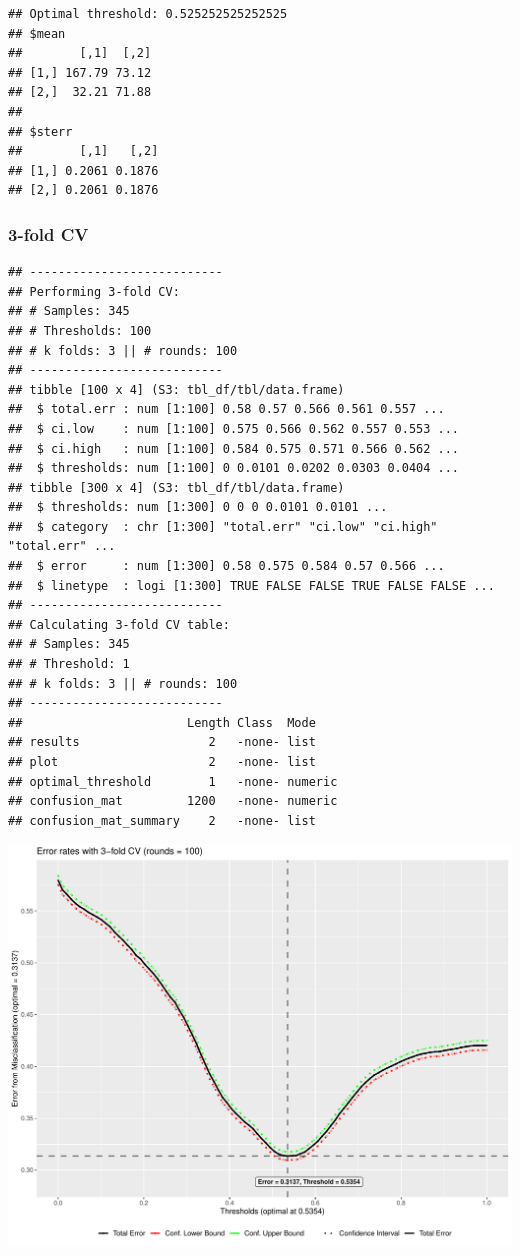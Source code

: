 \documentclass[
  11pt,
  a4paper,
]{scrartcl}
\begin{document}
\begin{verbatim}
## Optimal threshold: 0.525252525252525
## $mean
##        [,1]  [,2]
## [1,] 167.79 73.12
## [2,]  32.21 71.88
## 
## $sterr
##        [,1]   [,2]
## [1,] 0.2061 0.1876
## [2,] 0.2061 0.1876
\end{verbatim}

\newpage

\hypertarget{fold-cv-1}{%
\subsubsection{3-fold CV}\label{fold-cv-1}}

\begin{verbatim}
## ---------------------------
## Performing 3-fold CV:
## # Samples: 345
## # Thresholds: 100
## # k folds: 3 || # rounds: 100
## ---------------------------
## tibble [100 x 4] (S3: tbl_df/tbl/data.frame)
##  $ total.err : num [1:100] 0.58 0.57 0.566 0.561 0.557 ...
##  $ ci.low    : num [1:100] 0.575 0.566 0.562 0.557 0.553 ...
##  $ ci.high   : num [1:100] 0.584 0.575 0.571 0.566 0.562 ...
##  $ thresholds: num [1:100] 0 0.0101 0.0202 0.0303 0.0404 ...
## tibble [300 x 4] (S3: tbl_df/tbl/data.frame)
##  $ thresholds: num [1:300] 0 0 0 0.0101 0.0101 ...
##  $ category  : chr [1:300] "total.err" "ci.low" "ci.high" "total.err" ...
##  $ error     : num [1:300] 0.58 0.575 0.584 0.57 0.566 ...
##  $ linetype  : logi [1:300] TRUE FALSE FALSE TRUE FALSE FALSE ...
## ---------------------------
## Calculating 3-fold CV table:
## # Samples: 345
## # Threshold: 1
## # k folds: 3 || # rounds: 100
## ---------------------------
##                       Length Class  Mode   
## results                  2   -none- list   
## plot                     2   -none- list   
## optimal_threshold        1   -none- numeric
## confusion_mat         1200   -none- numeric
## confusion_mat_summary    2   -none- list
\end{verbatim}

\begin{center}\includegraphics{figure/analysis-glm-3cv-plot-1} \end{center}
\end{document}
